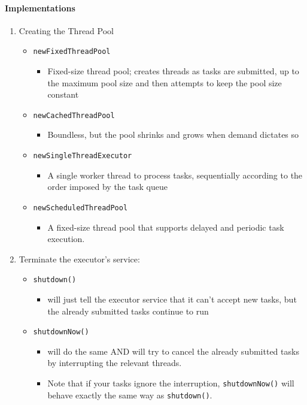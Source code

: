 \documentclass[a4paper]{article}
\begin{document}
\paragraph{Implementations}
\begin{enumerate}
	\item Creating the Thread Pool
	\begin{itemize}
		\item \texttt{newFixedThreadPool}
		\begin{itemize}[label=$\circ$]
			\item Fixed-size thread pool; creates threads as tasks are submitted, up to the maximum pool size and then attempts to keep the pool size constant
		\end{itemize}
		\item \texttt{newCachedThreadPool}
		\begin{itemize}[label=$\circ$]
			\item Boundless, but the pool shrinks and grows when demand dictates so
		\end{itemize}
		\item \texttt{newSingleThreadExecutor}
		\begin{itemize}[label=$\circ$]
			\item A single worker thread to process tasks, sequentially according to the order imposed by the task queue
		\end{itemize}
		\item \texttt{newScheduledThreadPool}
		\begin{itemize}[label=$\circ$]
			\item A fixed-size thread pool that supports delayed and periodic task execution.
		\end{itemize}
	\end{itemize}
	\item Terminate the executor's service:
	\begin{itemize}
		\item \texttt{shutdown()}
		\begin{itemize}[label=$\circ$]
			\item will just tell the executor service that it can't accept new tasks, but the already submitted tasks continue to run
		\end{itemize}
		\item \texttt{shutdownNow()}
		\begin{itemize}[label=$\circ$]
			\item will do the same AND will try to cancel the already submitted tasks by interrupting the relevant threads.
			\item Note that if your tasks ignore the interruption, \texttt{shutdownNow()} will behave exactly the same way as \texttt{shutdown()}.
		\end{itemize}
	\end{itemize}
\end{enumerate}
\end{document}
